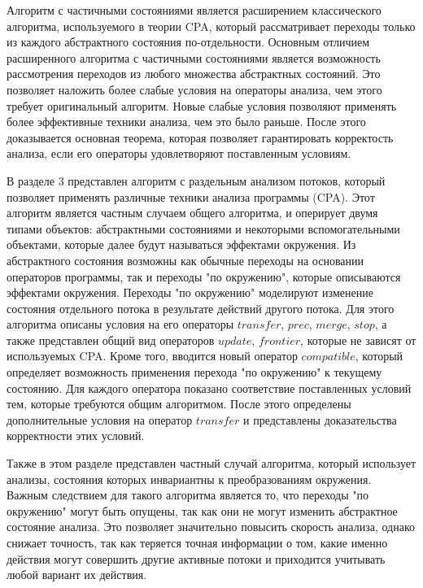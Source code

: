 Алгоритм с частичными состояниями является расширением классического алгоритма, используемого в теории CPA, который рассматривает переходы только из каждого абстрактного состояния по-отдельности.
Основным отличием расширенного алгоритма с частичными состояниями является возможность рассмотрения переходов из любого множества абстрактных состояний. 
Это позволяет наложить более слабые условия на операторы анализа, чем этого требует оригинальный алгоритм.
Новые слабые условия позволяют применять более эффективные техники анализа, чем это было раньше.
После этого доказывается основная теорема, которая позволяет гарантировать корректость анализа, если его операторы удовлетворяют поставленным условиям.

В разделе 3 представлен алгоритм с раздельным анализом потоков, который позволяет применять различные техники анализа программы (CPA).
Этот алгоритм является частным случаем общего алгоритма, и оперирует двумя типами объектов: абстрактными состояниями и некоторыми вспомогательными объектами, которые далее будут называться эффектами окружения.
Из абстрактного состояния возможны как обычные переходы на основании операторов программы, так и переходы "по окружению", которые описываются эффектами окружения.
Переходы "по окружению" моделируют изменение состояния отдельного потока в результате действий другого потока.
Для этого алгоритма описаны условия на его операторы $transfer$, $prec$, $merge$, $stop$, а также представлен общий вид операторов $update$, $frontier$, которые не зависят от используемых CPA.
Кроме того, вводится новый оператор $compatible$, который определяет возможность применения перехода "по окружению" к текущему состоянию.
Для каждого оператора показано соответствие поставленных условий тем, которые требуются общим алгоритмом.
После этого определены дополнительные условия на оператор $transfer$ и представлены доказательства корректности этих условий.

Также в этом разделе представлен частный случай алгоритма, который использует анализы, состояния которых инвариантны к преобразованиям окружения.
Важным следствием для такого алгоритма является то, что переходы "по окружению" могут быть опущены, так как они не могут изменить абстрактное состояние анализа.
Это позволяет значительно повысить скорость анализа, однако снижает точность, так как теряется точная информации о том, какие именно действия могут совершить другие активные потоки и приходится учитывать любой вариант их действия.


